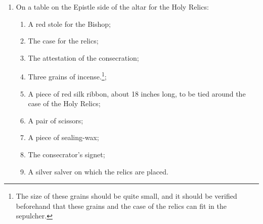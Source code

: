 \documentclass[letterpaper]{report}
\begin{document}
{\begin{enumerate}[label=\Roman*.]
\begin{enumerate}[label=\arabic*.]
                \item A small urn or tabernacle, ornamented with red silk, in
                    which the case of the relics will be placed. A silver
                    salver with a small red cloth may substitute;
                
                \item Near the altar a bier for carrying the relics;

                \item Two candlesticks.

            \end{enumerate}

        \item On a table on the Epistle side of the altar for the Holy Relics:

            \begin{enumerate}[label=\arabic*.]

                \item A red stole for the Bishop;
                    
                \item The case for the relics;

                \item The attestation of the consecration;

                \item Three grains of incense.\footnote{The size of these
                    grains should be quite small, and it should be verified
                    beforehand that these grains and the case of the relics can
                    fit in the sepulcher.};

                \item A piece of red silk ribbon, about 18 inches long, to be
                    tied around the case of the Holy Relics;

                \item A pair of scissors;

                \item A piece of sealing-wax;

                \item The consecrator's signet;

                \item A silver salver on which the relics are placed.

            \end{enumerate}


\end{enumerate}}
\end{document}
